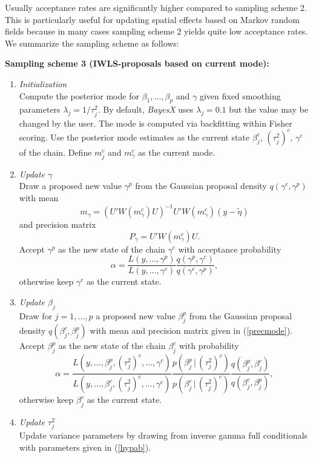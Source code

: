 \documentclass[11pt,a4paper,twoside]{bayesxarticle}
\begin{document}
Usually acceptance rates are significantly higher compared to
sampling scheme 2. This is particularly useful for updating
spatial effects based on Markov random fields because in many
cases sampling scheme 2 yields quite low acceptance rates. We
summarize the sampling scheme as follows:

{\bf Sampling scheme 3 (IWLS-proposals based on current mode):}

\begin{enumerate}
\item {\em Initialization} \\
Compute the posterior mode for $\beta_1,\dots,\beta_p$ and
$\gamma$ given fixed smoothing parameters $\lambda_j =
1/\tau^2_j$. By default, {\em BayesX} uses $\lambda_j = 0.1$ but
the value may be changed by the user. The mode is computed via
backfitting within Fisher scoring. Use the posterior mode
estimates as the current state $\beta_j^c$, $(\tau_j^2)^c$,
$\gamma^c$ of the chain. Define $m_j^c$ and $m_{\gamma}^c$ as the
current mode.
\item {\em Update $\gamma$} \\
Draw a proposed new value $\gamma^p$ from the Gaussian proposal
density $q(\gamma^c,\gamma^p)$ with mean
$$
m_{\gamma} = (U' W(m_{\gamma}^c) U)^{-1}U' W(m_{\gamma}^c)
(y-\tilde{\eta} )
$$
and precision matrix
$$
P_{\gamma} = U' W(m_{\gamma}^c) U.
$$
Accept $\gamma^p$ as the new state of the chain $\gamma^c$ with
acceptance probability
$$
\alpha = \frac{ L(y,\dots,\gamma^p)} {L(y,\dots,\gamma^c)} \frac{
q(\gamma^p,\gamma^c)}{q(\gamma^c,\gamma^p)},
$$
otherwise keep $\gamma^c$ as the current state.
\item {\em Update $\beta_j$} \\
Draw for $j=1,\dots,p$ a proposed new value $\beta_j^p$ from the
Gaussian proposal density $q(\beta_j^c,\beta_j^p)$ with mean and
precision matrix given in (\ref{precmode}). Accept $\beta^p_j$ as
the new state of the chain $\beta_j^c$ with probability
$$
\alpha = \frac{
L(y,\dots,\beta^{p}_j,(\tau_j^2)^{c},\dots,\gamma^c)}
{L(y,\dots,\beta^{c}_j,(\tau_j^2)^{c},\dots,\gamma^c)}
\frac{p(\beta_j^p \, | \, (\tau_j^2)^c)}{p(\beta_j^c \, | \,
(\tau_j^2)^c)} \frac{
q(\beta_j^p,\beta_j^c)}{q(\beta_j^c,\beta_j^p)},
$$
otherwise keep $\beta_j^c$ as the current state.
\item {\em Update $\tau^2_j$} \\
Update variance parameters by drawing from inverse gamma full
conditionals with parameters given in (\ref{hypab}).
\end{enumerate}
\end{document}
